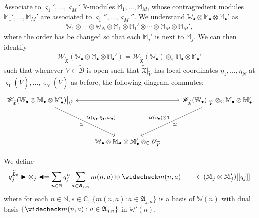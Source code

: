\documentclass[12pt,a4paper,notitlepage]{article}
\theoremstyle{definition}
\theoremstyle{plain}
\newcommand{\fk}{\mathfrak}
\newcommand{\mc}{\mathcal}
\newcommand{\wtd}{\widetilde}
\newcommand{\wch}{\widecheck}
\newcommand{\id}{\mathbf{1}}
\newcommand{\scr}{\mathscr}
\newcommand{\sgm}{\varsigma}
\newcommand{\blt}{\bullet}
\newcommand{\Vbb}{\mathbb V}
\newcommand{\Wbb}{\mathbb W}
\newcommand{\Mbb}{\mathbb M}
\newcommand{\Cbb}{\mathbb C}
\newcommand{\Nbb}{\mathbb N}
\newcommand{\btl}{\blacktriangleleft}
\newcommand{\btr}{\blacktriangleright}
\numberwithin{equation}{section}
\begin{document}
Associate to $\sgm_1',\dots,\sgm_M'$  $\Vbb$-modules $\Mbb_1,\dots,\Mbb_M$, whose contragredient modules $\Mbb_1',\dots,\Mbb_M'$ are associated to $\sgm_1'',\dots,\sgm_M''$. We understand $\Wbb_\blt\otimes\Mbb_\blt\otimes\Mbb_\blt'$ as
\begin{gather*}
\Wbb_1\otimes\cdots\otimes \Wbb_N\otimes\Mbb_1\otimes\Mbb_1'\otimes\cdots\otimes\Mbb_M\otimes\Mbb_M',
\end{gather*}
where the order has be changed so that each $\Mbb_j'$ is next to $\Mbb_j$. We can then identify
\begin{align}\label{eq27}
\scr W_{\wtd{\fk X}}(\Wbb_\blt\otimes\Mbb_\blt\otimes\Mbb_\blt')=\scr W_{\wtd{\fk X}}(\Wbb_\blt)\otimes_\Cbb\Mbb_\blt\otimes\Mbb_\blt'	
\end{align}
such that whenever $\wtd V\subset\wtd{\mc B}$ is open such that $\wtd{\fk X}|_{\wtd V}$ has local coordinates $\eta_1,\dots,\eta_N$ at $\sgm_1(\wtd V),\dots,\sgm_N(\wtd V)$ as before, the following diagram commutes:
\begin{equation}
\begin{tikzcd}
\scr W_{\wtd{\fk X}}(\Wbb_\blt\otimes\Mbb_\blt\otimes\Mbb_\blt')\big|_{\wtd V} \arrow[rr,leftrightarrow,"="] \arrow[ddr,"\simeq"',"{\mc U(\eta_\blt,\xi_\blt,\varpi_\blt)}"] &&\scr W_{\wtd{\fk X}}(\Wbb_\blt)\big|_{\wtd V}\otimes_\Cbb\Mbb_\blt\otimes\Mbb_\blt'\arrow[ddl,"\simeq","\mc U(\eta_\blt)\otimes\id"']\\{}\\
&\Wbb_\blt\otimes\Mbb_\blt\otimes\Mbb_\blt'\otimes_\Cbb\scr O_{\wtd V} 
\end{tikzcd}	
\end{equation}

We define
\begin{gather*}
q_j^{\wtd L_0}\btr\otimes_j\btl=\sum_{n\in\Nbb} q_j^n\sum_{a\in\fk A_{j,n}} m{(n,a)}\otimes\wch m{(n,a)}\qquad \in(\Mbb_j\otimes\Mbb_j')[[q_j]]
\end{gather*}
where for each $n\in\Nbb,s\in\Cbb$, $\{m{(n,a)}:a\in\fk A_{j,n}\}$ is a basis of $\Wbb{(n)}$ with dual basis	$\{\wch m{(n,a)}:a\in\fk A_{j,n}\}$ in $\Wbb'{(n)}$.

	
	
\end{document}
